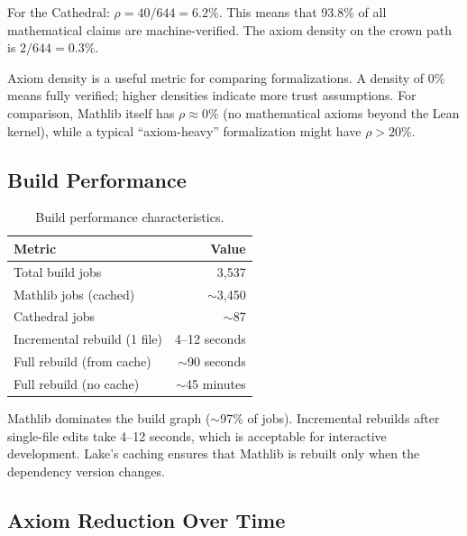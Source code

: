 \documentclass[11pt,a4paper]{article}
\begin{document}
For the Cathedral: $\rho = 40 / 644 = 6.2\%$. This means that
93.8\% of all mathematical claims are machine-verified. The axiom
density on the crown path is $2 / 644 = 0.3\%$.

\begin{remark}
Axiom density is a useful metric for comparing formalizations. A
density of 0\% means fully verified; higher densities indicate more
trust assumptions. For comparison, Mathlib itself has $\rho \approx 0\%$
(no mathematical axioms beyond the Lean kernel), while a typical
``axiom-heavy'' formalization might have $\rho > 20\%$.
\end{remark}

\subsection{Build Performance}

\begin{table}[h]
\centering
\begin{tabular}{@{}lr@{}}
\toprule
\textbf{Metric} & \textbf{Value} \\
\midrule
Total build jobs & 3,537 \\
Mathlib jobs (cached) & $\sim$3,450 \\
Cathedral jobs & $\sim$87 \\
Incremental rebuild (1 file) & 4--12 seconds \\
Full rebuild (from cache) & $\sim$90 seconds \\
Full rebuild (no cache) & $\sim$45 minutes \\
\bottomrule
\end{tabular}
\caption{Build performance characteristics.}
\label{tab:build}
\end{table}

Mathlib dominates the build graph ($\sim$97\% of jobs). Incremental
rebuilds after single-file edits take 4--12 seconds, which is
acceptable for interactive development. Lake's caching ensures that
Mathlib is rebuilt only when the dependency version changes.

\subsection{Axiom Reduction Over Time}
\end{document}
